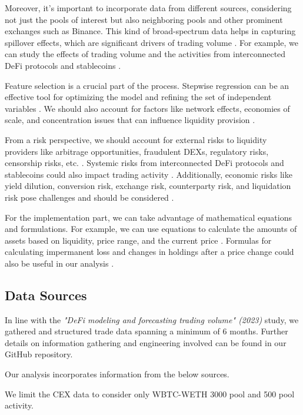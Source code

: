 \documentclass{article}
\begin{document}
Moreover, it's important to incorporate data from different sources, considering not just the pools of interest but also neighboring pools and other prominent exchanges such as Binance. This kind of broad-spectrum data helps in capturing spillover effects, which are significant drivers of trading volume \cite{Miori2023}. For example, we can study the effects of trading volume and the activities from interconnected DeFi protocols and stablecoins \cite{Miori2022}.

Feature selection is a crucial part of the process. Stepwise regression can be an effective tool for optimizing the model and refining the set of independent variables \cite{Miori2023}. We should also account for factors like network effects, economies of scale, and concentration issues that can influence liquidity provision \cite{Makarov2022, Miori2022}.

From a risk perspective, we should account for external risks to liquidity providers like arbitrage opportunities, fraudulent DEXs, regulatory risks, censorship risks, etc. \cite{Aigner2021}. Systemic risks from interconnected DeFi protocols and stablecoins could also impact trading activity \cite{Makarov2022}. Additionally, economic risks like yield dilution, conversion risk, exchange risk, counterparty risk, and liquidation risk pose challenges and should be considered \cite{Xu2023}.

For the implementation part, we can take advantage of mathematical equations and formulations. For example, we can use equations to calculate the amounts of assets based on liquidity, price range, and the current price \cite{Elsts2021}. Formulas for calculating impermanent loss and changes in holdings after a price change could also be useful in our analysis \cite{Elsts2021, Aigner2021, Heimbach2022}.

\subsection{\textbf{Data Sources}}

In line with the \textit{"DeFi modeling and forecasting trading volume" (2023)} study\cite{Miori2023}, we gathered and structured trade data spanning a minimum of 6 months. Further details on information gathering and engineering involved can be found in our GitHub repository\cite{TeamRepo}. 

Our analysis incorporates information from the below sources.

We limit the CEX data to consider only WBTC-WETH 3000 pool and 500 pool activity.
\end{document}
